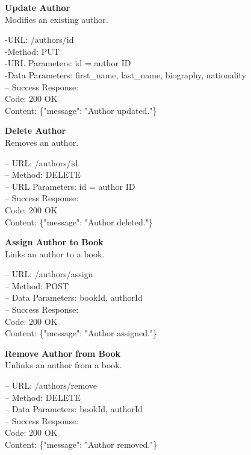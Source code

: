 \begin{flushleft}
\textbf{Update Author} \\
Modifies an existing author.

-URL: /authors/{id} \\
-Method: PUT \\
-URL Parameters: id = author ID \\
-Data Parameters: first\_name, last\_name, biography, nationality \\
– Success Response: \\
Code: 200 OK \\
Content: \{"message": "Author updated."\}
\end{flushleft}

\begin{flushleft}
\textbf{Delete Author} \\
Removes an author.

– URL: /authors/{id} \\
– Method: DELETE \\
– URL Parameters: id = author ID \\
– Success Response: \\
Code: 200 OK \\
Content: \{"message": "Author deleted."\}
\end{flushleft}

\begin{flushleft}
\textbf{Assign Author to Book} \\
Links an author to a book.

– URL: /authors/assign \\
– Method: POST \\
– Data Parameters: bookId, authorId \\
– Success Response: \\
Code: 200 OK \\
Content: \{"message": "Author assigned."\}
\end{flushleft}

\begin{flushleft} 
\textbf{Remove Author from Book} \\
Unlinks an author from a book.

– URL: /authors/remove \\
– Method: DELETE \\
– Data Parameters: bookId, authorId \\
– Success Response: \\
Code: 200 OK \\
Content: \{"message": "Author removed."\}
\end{flushleft}

